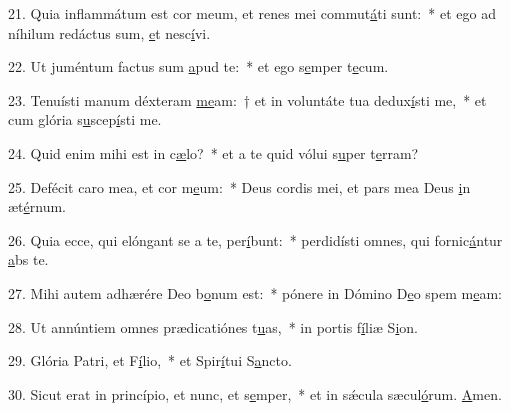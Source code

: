 21. Quia inflammátum est cor meum, et renes mei commut\uline{á}ti sunt:~* et ego ad níhilum redáctus sum, \uline{e}t nesc\uline{í}vi.\par 
22. Ut juméntum factus sum \uline{a}pud te:~* et ego s\uline{e}mper t\uline{e}cum.\par 
23. Tenuísti manum déxteram \uline{me}am:~† et in voluntáte tua dedux\uline{í}sti me,~* et cum glória s\uline{u}scep\uline{í}sti me.\par 
24. Quid enim mihi est in c\uline{æ}lo?~* et a te quid vólui s\uline{u}per t\uline{e}rram?\par 
25. Defécit caro mea, et cor m\uline{e}um:~* Deus cordis mei, et pars mea Deus \uline{i}n æt\uline{é}rnum.\par 
26. Quia ecce, qui elóngant se a te, per\uline{í}bunt:~* perdidísti omnes, qui fornic\uline{á}ntur \uline{a}bs te.\par 
27. Mihi autem adhærére Deo b\uline{o}num est:~* pónere in Dómino D\uline{e}o spem m\uline{e}am:\par 
28. Ut annúntiem omnes prædicatiónes t\uline{u}as,~* in portis f\uline{í}liæ S\uline{i}on.\par 
29. Glória Patri, et F\uline{í}lio,~* et Spir\uline{í}tui S\uline{a}ncto.\par 
30. Sicut erat in princípio, et nunc, et s\uline{e}mper,~* et in sǽcula sæcul\uline{ó}rum. \uline{A}men.\par 
